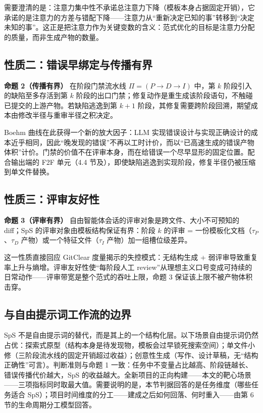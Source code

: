 \documentclass[11pt,a4paper]{ctexart}
\begin{document}
需要澄清的是：注意力集中性不承诺总注意力下降（模板本身占据固定开销），它承诺的是注意力的方差与错配下降——注意力从“重新决定已知的事”转移到“决定未知的事”。这正是把注意力作为关键变数的含义：范式优化的目标是注意力分配的质量，而非生成产物的数量。

\subsection{性质二：错误早绑定与传播有界}
\textbf{命题 2（传播有界）} 在阶段门禁流水线 $\Pi=(P\to D\to I)$ 中，第 $k$ 阶段引入的缺陷至多存活到第 $k$ 阶段的出口门禁；修复动作是重生成该阶段语句，不触碰已提交的上游产物。若缺陷逃逸到第 $k+1$ 阶段，其修复需要跨阶段回溯，期望成本由修改半径与重审半径之积决定。

Boehm 曲线\cite{ref7}在此获得一个新的放大因子：LLM 实现错误设计与实现正确设计的成本近乎相同\cite{ref14,ref15}，因此“晚发现的错误”不再以工时计价，而以“已高速生成的错误产物体积”计价。门禁的价值不在评审本身，而在给错误一个尽早显形的固定位置。配合输出端的 F2F 单元（4.4 节及\cite{ref20}），即使缺陷逃逸到实现阶段，修复半径仍被压缩到单文件替换。

\subsection{性质三：评审友好性}
\textbf{命题 3（评审有界）} 自由智能体会话的评审对象是跨文件、大小不可预知的 diff；SpS 的评审对象由模板结构保证有界：阶段 $k$ 的评审 = 一份模板化文档（$\tau_P$、$\tau_D$ 产物）或一个特征文件（$\tau_I$ 产物）加一组槽位级差异。

这一性质直接回应 GitClear 度量揭示的失控模式\cite{ref2}：无结构生成 + 弱评审导致重复率上升与熵增。评审友好性使“每阶段人工 review”从理想主义口号变成可持续的日常动作——评审带宽是整个范式的吞吐上限，命题 3 保证该上限不被产物体积击穿。

\subsection{与自由提示词工作流的边界}
SpS 不是自由提示词的替代，而是其上的一个结构化层。以下场景自由提示词仍然占优：探索式原型（结构本身是待发现物，模板会过早锁死搜索空间）；单文件小修（三阶段流水线的固定开销超过收益）；创意性生成（写作、设计草稿，无“结构正确性”可言）。判断准则与命题 1 一致：任务中不变量占比越高、阶段链越长、错误传播代价越大，SpS 的收益越大。全新项目的正向构建——本文的靶心场景——三项指标同时取最大值。需要说明的是，本节判据回答的是任务维度（哪些任务适合 SpS）；项目时间维度的分工——建成之后如何回落、何时重入——由第 6 节的生命周期分工模型回答。
\end{document}
